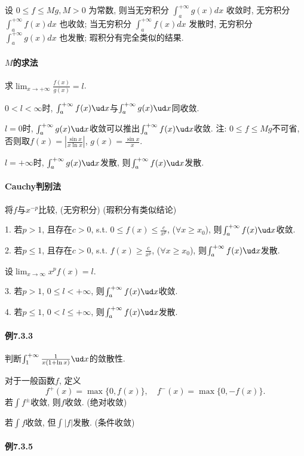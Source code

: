 设 $0\leqslant f\leqslant Mg,M>0$ 为常数, 则当无穷积分 $\int_{a}^{+\infty}g(x)dx$
收敛时, 无穷积分 $\int_{a}^{+\infty}f(x)dx$ 也收敛; 当无穷积分 $\int_{a}^{+\infty}f(x)dx$
发散时, 无穷积分 $\int_{a}^{+\infty}g(x)dx$ 也发散; 瑕积分有完全类似的结果.

\paragraph{$M$的求法}

求$\lim_{x\to+\infty}\frac{f(x)}{g(x)}=l$.

$0<l<\infty$时, $\int_{a}^{+\infty}f(x)\ud x$与$\int_{a}^{+\infty}g(x)\ud x$同收敛.

$l=0$时, $\int_{a}^{+\infty}g(x)\ud x$收敛可以推出$\int_{a}^{+\infty}f(x)\ud x$收敛.
注: $0\le f\le Mg$不可省, 否则取$f(x)=\left|\frac{\sin x}{x\ln x}\right|$,
$g(x)=\frac{\sin x}{x}$.

$l=+\infty$时, $\int_{a}^{+\infty}g(x)\ud x$发散, 则$\int_{a}^{+\infty}f(x)\ud x$发散.

\paragraph{Cauchy判别法}

将$f$与$x^{-p}$比较, (无穷积分) (瑕积分有类似结论)

1. 若$p>1$, 且存在$c>0$, s.t. $0\le f(x)\le\frac{c}{x^{p}}$, ($\forall x\ge x_{0}$),
则$\int_{a}^{+\infty}f(x)\ud x$收敛.

2. 若$p\le1$, 且存在$c>0$, s.t. $f(x)\ge\frac{c}{x^{p}}$, ($\forall x\ge x_{0}$),
则$\int_{a}^{+\infty}f(x)\ud x$发散.

设$\lim_{x\to\infty}x^{p}f(x)=l$.

3. 若$p>1$, $0\le l<+\infty$, 则$\int_{a}^{+\infty}f(x)\ud x$收敛.

4. 若$p\le1$, $0<l\le+\infty$, 则$\int_{a}^{+\infty}f(x)\ud x$发散.

\paragraph{例7.3.3}

判断$\int_{1}^{+\infty}\frac{1}{x(1+\ln x)}\ud x$的敛散性.

对于一般函数$f$, 定义
\[
f^{+}(x)=\max\{0,f(x)\},\quad f^{-}(x)=\max\{0,-f(x)\}.
\]
若$\int f^{\pm}$收敛, 则$f$收敛. (绝对收敛)

若$\int f$收敛, 但$\int\left|f\right|$发散. (条件收敛)

\paragraph{例7.3.5}

